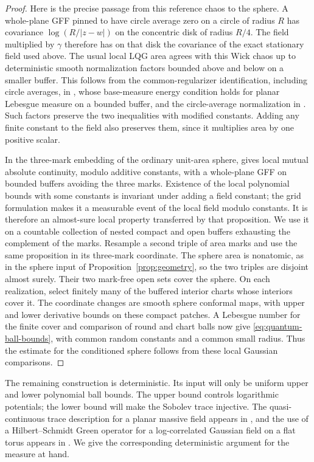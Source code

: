 \begin{proof}
Here is the precise passage from this reference chaos to the sphere.
A whole-plane GFF pinned to have circle average zero on a circle of
radius $R$ has covariance $\log(R/|z-w|)$ on the concentric disk of
radius $R/4$.  The field multiplied by $\gamma$ therefore has on that disk
the covariance of the exact stationary field used above.  The usual local
LQG area agrees with this
Wick chaos up to deterministic smooth normalization factors bounded above
and below on a smaller buffer.  This follows from the common-regularizer
identification, including circle averages, in
\cite[Theorem~1.1]{Berestycki2017GMC}, whose base-measure energy condition
holds for planar Lebesgue measure on a bounded buffer, and the circle-average normalization
in \cite[Propositions~1.2 and~3.2]{DuplantierSheffield2011KPZ}.
Such factors preserve the two inequalities with modified constants.
Adding any finite constant to the field also preserves them, since it
multiplies area by one positive scalar.

In the three-mark embedding of the ordinary unit-area sphere,
\cite[Proposition~3.5]{C} gives local mutual absolute continuity, modulo
additive constants, with a whole-plane GFF on bounded buffers avoiding
the three marks.  Existence of the local polynomial bounds with some
constants is invariant under adding a field constant; the grid formulation
makes it a measurable event of the local field modulo constants.  It is
therefore an almost-sure local property transferred by that proposition.  We use
it on a countable collection of nested compact and open buffers exhausting
the complement of the marks.  Resample a second triple of area marks and
use the same proposition in its three-mark coordinate.  The sphere area
is nonatomic, as in the sphere input of Proposition~\ref{prop:geometry},
so the two triples are disjoint almost surely.  Their two mark-free open
sets cover the sphere.  On each realization, select finitely many of the
buffered interior charts whose interiors cover it.  The coordinate
changes are smooth sphere conformal maps, with upper and lower derivative
bounds on these compact patches.  A Lebesgue number for the finite cover
and comparison of round and chart balls now give
\eqref{eq:quantum-ball-bounds}, with common random constants and a common
small radius.  Thus the estimate for the conditioned sphere follows from
these local Gaussian comparisons.
\end{proof}

The remaining construction is deterministic.  Its input will only be
uniform upper and lower polynomial ball bounds.  The upper bound controls
logarithmic potentials; the lower bound will make the Sobolev trace
injective.  The quasi-continuous trace description for a planar massive
field appears in \cite[Section~2.3]{AndresKajino2016Heat}, and the use of a
Hilbert--Schmidt Green operator for a log-correlated Gaussian field on a
flat torus appears in \cite[Section~3]{MaillardRhodesVargasZeitouni2016Heat}.
We give the corresponding deterministic argument for the measure at hand.


